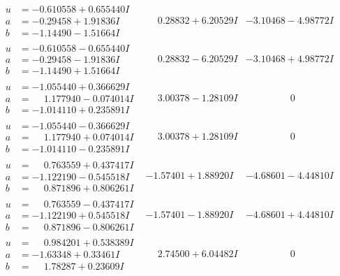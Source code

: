 \documentclass[1p]{elsarticle_modified}
\theoremstyle{definition}
\begin{document}
$$\begin{array}{c|c|c}
\begin{aligned}
u &= -0.610558 + 0.655440 I \\
a &= -0.29458 + 1.91836 I \\
b &= -1.14490 - 1.51664 I\end{aligned}
 & \phantom{-}0.28832 + 6.20529 I & -3.10468 - 4.98772 I \\ \hline\begin{aligned}
u &= -0.610558 - 0.655440 I \\
a &= -0.29458 - 1.91836 I \\
b &= -1.14490 + 1.51664 I\end{aligned}
 & \phantom{-}0.28832 - 6.20529 I & -3.10468 + 4.98772 I \\ \hline\begin{aligned}
u &= -1.055440 + 0.366629 I \\
a &= \phantom{-}1.177940 - 0.074014 I \\
b &= -1.014110 + 0.235891 I\end{aligned}
 & \phantom{-}3.00378 - 1.28109 I & \phantom{-0.000000 } 0 \\ \hline\begin{aligned}
u &= -1.055440 - 0.366629 I \\
a &= \phantom{-}1.177940 + 0.074014 I \\
b &= -1.014110 - 0.235891 I\end{aligned}
 & \phantom{-}3.00378 + 1.28109 I & \phantom{-0.000000 } 0 \\ \hline\begin{aligned}
u &= \phantom{-}0.763559 + 0.437417 I \\
a &= -1.122190 - 0.545518 I \\
b &= \phantom{-}0.871896 + 0.806261 I\end{aligned}
 & -1.57401 + 1.88920 I & -4.68601 - 4.44810 I \\ \hline\begin{aligned}
u &= \phantom{-}0.763559 - 0.437417 I \\
a &= -1.122190 + 0.545518 I \\
b &= \phantom{-}0.871896 - 0.806261 I\end{aligned}
 & -1.57401 - 1.88920 I & -4.68601 + 4.44810 I \\ \hline\begin{aligned}
u &= \phantom{-}0.984201 + 0.538389 I \\
a &= -1.63348 + 0.33461 I \\
b &= \phantom{-}1.78287 + 0.23609 I\end{aligned}
 & \phantom{-}2.74500 + 6.04482 I & \phantom{-0.000000 } 0 \\ \hline\begin{aligned}

\end{aligned}
\end{array}$$
\end{document}
